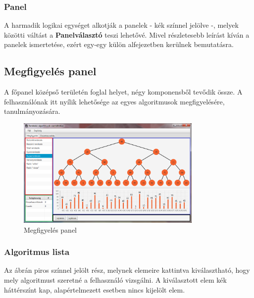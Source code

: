 \documentclass{elteikthesis}
\begin{document}
\subsubsection{Panel}
A harmadik logikai egységet alkotják a panelek - kék színnel jelölve -, melyek közötti váltást a \textbf{Panelválasztó} teszi lehetővé. Mivel részletesebb leírást kíván a panelek ismertetése, ezért egy-egy külön alfejezetben kerülnek bemutatásra.

\subsection{Megfigyelés panel}
A főpanel középső területén foglal helyet, négy komponensből tevődik össze. A felhasználónak itt nyílik lehetősége az egyes algoritmusok megfigyelésére, tanulmányozására.
 \begin{figure}[H]
 	\centering
 	\includegraphics[width=0.8\textwidth]{pics/watchpanel.png}
 	\caption{Megfigyelés panel}
 \end{figure}
\subsubsection{Algoritmus lista}
Az ábrán piros színnel jelölt rész, melynek elemeire kattintva kiválasztható, hogy mely algoritmust szeretné a felhasználó vizsgálni. A kiválasztott elem kék háttérszínt kap, alapértelmezett esetben nincs kijelölt elem.
\end{document}
